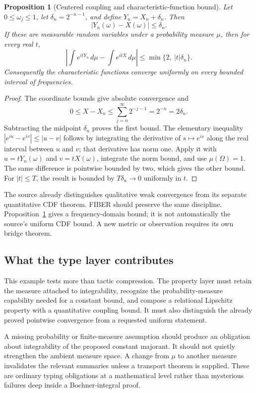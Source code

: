 \documentclass[11pt,letterpaper]{article}
\newtheorem{proposition}[theorem]{Proposition}
\theoremstyle{definition}\newtheorem{definition}[theorem]{Definition}
\begin{document}
\begin{proposition}[Centered coupling and characteristic-function bound]\label{prop:coupling}
Let $0\le\omega_j\le1$, let $\delta_n=2^{-n-1}$, and define $Y_n=X_n+\delta_n$. Then
\[
 |Y_n(\omega)-X(\omega)|\le\delta_n.
\]
If these are measurable random variables under a probability measure $\mu$, then for every real $t$,
\[
 \left|\int e^{itY_n}\,d\mu-\int e^{itX}\,d\mu\right|
       \le\min\{2,\ |t|\delta_n\}.
\]
Consequently the characteristic functions converge uniformly on every bounded interval of frequencies.
\end{proposition}
\begin{proof}
The coordinate bounds give absolute convergence and
\[
 0\le X-X_n\le\sum_{j=n}^{\infty}2^{-j-1}=2^{-n}=2\delta_n.
\]
Subtracting the midpoint $\delta_n$ proves the first bound. The elementary inequality
$|e^{iu}-e^{iv}|\le|u-v|$ follows by integrating the derivative of $s\mapsto e^{is}$ along the real interval between $u$ and $v$; that derivative has norm one. Apply it with $u=tY_n(\omega)$ and $v=tX(\omega)$, integrate the norm bound, and use $\mu(\Omega)=1$. The same difference is pointwise bounded by two, which gives the other bound. For $|t|\le T$, the result is bounded by $T\delta_n\to0$ uniformly in $t$.
\end{proof}
The source already distinguishes qualitative weak convergence from its separate quantitative CDF theorem. FIBER should preserve the same discipline. Proposition~\ref{prop:coupling} gives a frequency-domain bound; it is not automatically the source's uniform CDF bound. A new metric or observation requires its own bridge theorem.

\subsection{What the type layer contributes}
This example tests more than tactic compression. The property layer must retain the measure attached to integrability, recognize the probability-measure capability needed for a constant bound, and compose a relational Lipschitz property with a quantitative coupling bound. It must also distinguish the already proved pointwise convergence from a requested uniform statement.

A missing probability or finite-measure assumption should produce an obligation about integrability of the proposed constant majorant. It should not quietly strengthen the ambient measure space. A change from $\mu$ to another measure invalidates the relevant summaries unless a transport theorem is supplied. These are ordinary typing obligations at a mathematical level rather than mysterious failures deep inside a Bochner-integral proof.
\end{document}
